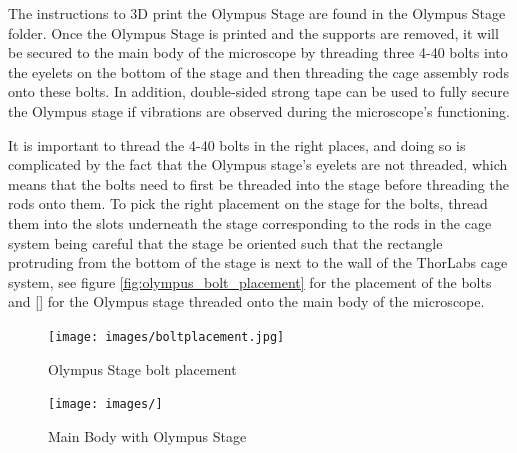 \documentclass[runningheads]{llncs}
\begin{document}
The instructions to 3D print the Olympus Stage are found in the Olympus Stage folder. Once the Olympus Stage is printed and the supports are removed, it will be secured to the main body of the microscope by threading three 4-40 bolts into the eyelets on the bottom of the stage and then threading the cage assembly rods onto these bolts. In addition, double-sided strong tape can be used to fully secure the Olympus stage if vibrations are observed during the microscope's functioning.

It is important to thread the 4-40 bolts in the right places, and doing so is complicated by the fact that the Olympus stage's eyelets are not threaded, which means that the bolts need to first be threaded into the stage before threading the rods onto them. To pick the right placement on the stage for the bolts, thread them into the slots underneath the stage corresponding to the rods in the cage system being careful that the stage be oriented such that the rectangle protruding from the bottom of the stage is next to the wall of the ThorLabs cage system, see figure \ref{fig:olympus_bolt_placement} for the placement of the bolts and \ref{} for the Olympus stage threaded onto the main body of the microscope.

\begin{figure}
    \centering
    \begin{minipage}[b]{0.38\textwidth}
        \texttt{[image: images/boltplacement.jpg]}
        \caption{Olympus Stage bolt placement}
        \label{fig:olympus_bolt_placement}
    \end{minipage}
    \hfill
    \begin{minipage}[b]{0.38\textwidth}
        \centering
        \texttt{[image: images/]} 
        \caption{Main Body with Olympus Stage}
        \label{fig:mainbody&olympus}
    \end{minipage}
\end{figure}
\end{document}
